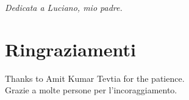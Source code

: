 \documentclass[a4paper, italian, 
, 12pt
, openright
]{book}
\begin{document}
\newpage \vspace*{8cm}
\begin{center}
\large {\it Dedicata a Luciano, mio padre.}
\end{center} 

\chapter*{Ringraziamenti}
Thanks to Amit Kumar Tevtia for the patience.
\\
Grazie a molte persone per l'incoraggiamento.


\pagestyle{empty}
\cleardoublepage
\addtolength{\hoffset}{-23pt} %

\pagestyle{fancy}
\addtolength{\headwidth}{0.7cm}

\renewcommand{\chaptermark}[1]{\markboth{\thechapter.\ #1}{}}
\renewcommand{\sectionmark}[1]{\markright{#1\ \thesection}}
\lhead[\fancyplain{}{\textbf{\footnotesize{\leftmark}}}]{}
\chead{}
\rhead[]{\fancyplain{}{\textbf{\footnotesize{\rightmark}}}}


\tableofcontents
\mainmatter








\end{document}
